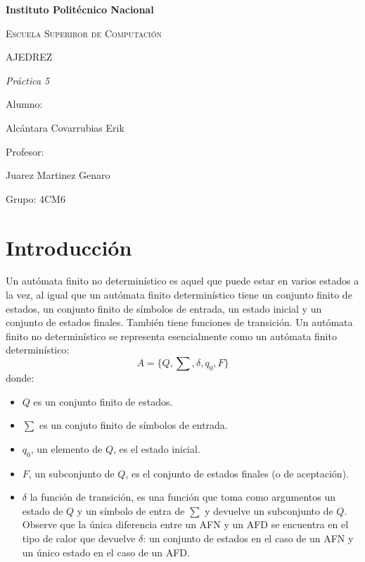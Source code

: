 \documentclass{article}
\begin{document}
\begin{titlepage}
\centering

{\bfseries\LARGE Instituto Polit\'ecnico Nacional \par}
\vspace{1cm}
{\scshape\Large Escuela Superiror de Computaci\'on \par}
\vspace{3cm}
{\scshape\Huge  AJEDREZ \par}
\vspace{3cm}
{\itshape\Large Pr\'actica 5 \par}
\vfill
{\Large Alumno: \par}
{\Large Alcántara Covarrubias Erik \par}
{\Large Profesor: \par}
{\Large Juarez Martinez Genaro \par}
{\Large Grupo: 4CM6\par}
\vfill
\end{titlepage}
\section{Introducci\'on}
Un autómata finito no determinístico es aquel que puede estar en varios estados a la vez, al igual que un autómata finito determinístico tiene un conjunto finito de estados, un conjunto finito de símbolos de entrada, un estado inicial y un conjunto de estados finales. También tiene funciones de transición. \newline \newline
Un autómata finito no determinístico se representa esencialmente como un autómata finito determinístico:
\begin{equation}
A =\{Q,\sum,\delta,q_0,F\}
\end{equation}
donde:
\begin{itemize}
    \item $Q$ es un conjunto finito de estados.
    \item $\sum$ es un conjuto finito de símbolos de entrada.
    \item $q_0$, un elemento de $Q$, es el estado inicial.
    \item $F$, un subconjunto de $Q$, es el conjunto de estados finales (o de aceptación).
    \item $\delta$ la función de transición, es una función que toma como argumentos un estado de $Q$ y un símbolo de entra de $\sum$ y devuelve un subconjunto de $Q$. Observe que la única diferencia entre un AFN y un AFD se encuentra en el tipo de calor que devuelve $\delta$: un conjunto de estados en el caso de un AFN y un único estado en el caso de un AFD. 
\end{itemize}
\end{document}
